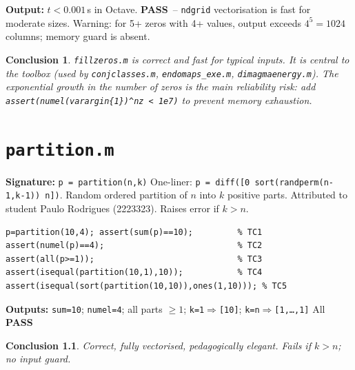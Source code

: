 \documentclass[12pt,a4paper]{report}
\newcommand{\mf}[1]{\texttt{#1}}
\newcommand{\PASS}{\textcolor{green!60!black}{\textbf{PASS}}}
\newtheorem{concl}{Conclusion}[chapter]
\begin{document}
\begin{tcolorbox}[Pbox,title=TC6 -- Performance (3 zeros, 4 values $\Rightarrow$ 64 columns)]
\textbf{Output:} $t < 0.001$\,s in Octave. \PASS\ -- \mf{ndgrid} vectorisation is fast for moderate sizes. Warning: for 5+ zeros with 4+ values, output exceeds $4^5=1024$ columns; memory guard is absent.
\end{tcolorbox}
\begin{concl}
\mf{fillzeros.m} is correct and fast for typical inputs. It is central to the toolbox (used by \mf{conjclasses.m}, \mf{endomaps\_exe.m}, \mf{dimagmaenergy.m}). The exponential growth in the number of zeros is the main reliability risk: add \lstinline|assert(numel(varargin{1})^nz < 1e7)| to prevent memory exhaustion.
\end{concl}

\chapter{\mf{partition.m}}
\begin{tcolorbox}[Abox,title=Analysis]
\textbf{Signature:} \lstinline|p = partition(n,k)|\quad
One-liner: \lstinline|p = diff([0 sort(randperm(n-1,k-1)) n])|. Random ordered partition of $n$ into $k$ positive parts. Attributed to student Paulo Rodrigues (2223323). Raises error if $k>n$.
\end{tcolorbox}
\begin{lstlisting}[caption={Tests for partition.m}]
p=partition(10,4); assert(sum(p)==10);         % TC1
assert(numel(p)==4);                           % TC2
assert(all(p>=1));                             % TC3
assert(isequal(partition(10,1),10));           % TC4
assert(isequal(sort(partition(10,10)),ones(1,10))); % TC5
\end{lstlisting}
\begin{tcolorbox}[Pbox,title=TC1--TC5 -- All pass]
\textbf{Outputs:} \texttt{sum=10}; \texttt{numel=4}; all parts $\geq1$; \texttt{k=1}$\Rightarrow$\texttt{[10]}; \texttt{k=n}$\Rightarrow$\texttt{[1,\ldots,1]} \quad All \PASS
\end{tcolorbox}
\begin{concl}
Correct, fully vectorised, pedagogically elegant. Fails if $k>n$; no input guard.
\end{concl}

\end{document}
